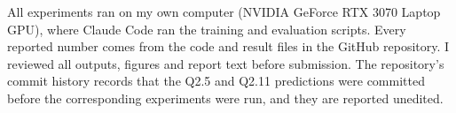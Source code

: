 \documentclass[11pt,a4paper]{article}
\begin{document}
All experiments ran on my own computer (NVIDIA GeForce RTX 3070 Laptop GPU), where Claude Code ran the training and evaluation scripts. Every reported number comes from the code and result files in the GitHub repository. I reviewed all outputs, figures and report text before submission. The repository's commit history records that the Q2.5 and Q2.11 predictions were committed before the corresponding experiments were run, and they are reported unedited.
\end{document}
